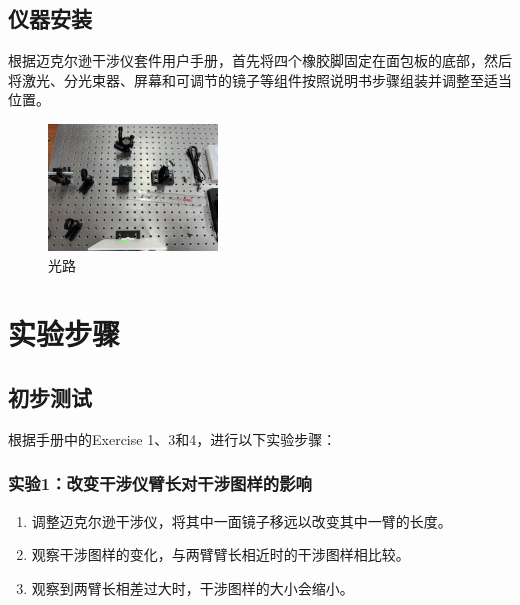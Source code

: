 \documentclass{ctexart}
\begin{document}
\subsection{仪器安装}
根据迈克尔逊干涉仪套件用户手册，首先将四个橡胶脚固定在面包板的底部，然后将激光、分光束器、屏幕和可调节的镜子等组件按照说明书步骤组装并调整至适当位置。

\begin{figure}[H]
    \centering
    \includegraphics[width=0.4\textwidth]{pictures/微信图片_20241212155934.jpg}
    \caption{光路}
\end{figure}

\section{实验步骤}
\subsection{初步测试}
根据手册中的Exercise 1、3和4，进行以下实验步骤：

\subsubsection{实验1：改变干涉仪臂长对干涉图样的影响}
\begin{enumerate}
    \item 调整迈克尔逊干涉仪，将其中一面镜子移远以改变其中一臂的长度。
    \item 观察干涉图样的变化，与两臂臂长相近时的干涉图样相比较。
    \item 观察到两臂长相差过大时，干涉图样的大小会缩小。
\end{enumerate}
\end{document}
